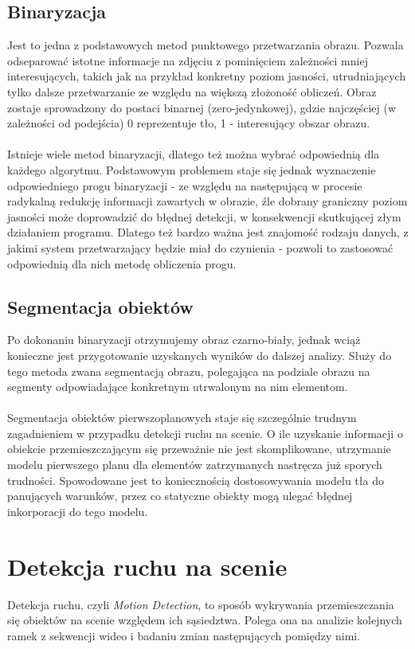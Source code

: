 \subsection{Binaryzacja}
Jest to jedna z podstawowych metod punktowego przetwarzania obrazu.  Pozwala odseparować istotne informacje na zdjęciu z pominięciem zależności mniej interesujących, takich jak na przykład konkretny poziom jasności, utrudniających tylko dalsze przetwarzanie ze względu na większą złożoność obliczeń. Obraz zostaje sprowadzony do postaci binarnej (zero-jedynkowej), gdzie najczęściej (w zależności od podejścia) 0 reprezentuje tło, 1 - interesujący obszar obrazu.  
\paragraph{}
Istnieje wiele metod binaryzacji, dlatego też można wybrać odpowiednią dla każdego algorytmu. Podstawowym problemem staje się jednak wyznaczenie odpowiedniego progu binaryzacji - ze względu na następującą w procesie radykalną redukcję informacji zawartych w obrazie, źle dobrany graniczny poziom jasności może doprowadzić do błędnej detekcji, w konsekwencji skutkującej złym działaniem programu. Dlatego też bardzo ważna jest znajomość rodzaju danych, z jakimi system przetwarzający będzie miał do czynienia - pozwoli to zastosować odpowiednią dla nich metodę obliczenia progu.
\subsection{Segmentacja obiektów}
Po dokonaniu binaryzacji otrzymujemy obraz czarno-biały, jednak wciąż konieczne jest przygotowanie uzyskanych wyników do dalszej analizy. Służy do tego metoda zwana segmentacją obrazu, polegająca na podziale obrazu na segmenty odpowiadające konkretnym utrwalonym na nim elementom.
\paragraph{}
Segmentacja obiektów pierwszoplanowych staje się szczególnie trudnym zagadnieniem w przypadku detekcji ruchu na scenie. O ile uzyskanie informacji o obiekcie przemieszczającym się przeważnie nie jest skomplikowane, utrzymanie modelu pierwszego planu dla elementów zatrzymanych nastręcza już sporych trudności. Spowodowane jest to koniecznością dostosowywania modelu tła do panujących warunków, przez co statyczne obiekty mogą ulegać błędnej inkorporacji do tego modelu.
\section{Detekcja ruchu na scenie}
Detekcja ruchu, czyli \textit{Motion Detection}, to sposób wykrywania przemieszczania się obiektów na scenie względem ich sąsiedztwa. Polega ona na analizie kolejnych ramek z sekwencji wideo i badaniu zmian następujących pomiędzy nimi.

